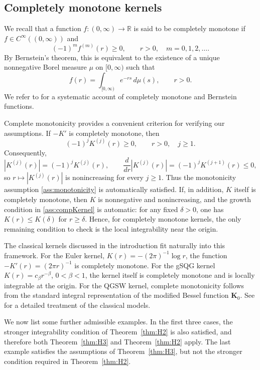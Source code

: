 \documentclass[a4paper]{amsart}
\theoremstyle{definition}
\begin{document}
\subsection{Completely monotone kernels}

We recall that a function \(f:(0,\infty)\to\mathbb{R}\) is said to be completely monotone if
\(f\in C^\infty((0,\infty))\) and
\[
    (-1)^m f^{(m)}(r)\ge 0,
    \qquad r>0,\quad m=0,1,2,\ldots.
\]
By Bernstein's theorem, this is equivalent to the existence of a unique nonnegative Borel measure
\(\mu\) on \([0,\infty)\) such that
\[
    f(r)=\int_{[0,\infty)} e^{-rs}\,d\mu(s),
    \qquad r>0.
\]
We refer to \cite[Chapter 1]{schilling2010bernstein} for a systematic account of completely monotone and
Bernstein functions.

Complete monotonicity provides a convenient criterion for verifying our assumptions. If
\(-K'\) is completely monotone, then
\[
    (-1)^j K^{(j)}(r)\ge 0,
    \qquad r>0,\quad j\ge 1.
\]
Consequently,
\[
    |K^{(j)}(r)|=(-1)^jK^{(j)}(r),
    \qquad
    \frac{d}{dr}|K^{(j)}(r)|
    =
    (-1)^jK^{(j+1)}(r)\le0,
\]
so \(r\mapsto |K^{(j)}(r)|\) is nonincreasing for every \(j\ge1\). Thus the monotonicity assumption
\ref{ass:monotonicity} is automatically satisfied. If, in addition, \(K\) itself is completely monotone, then \(K\) is nonnegative and nonincreasing, and the growth condition in \ref{ass:compKernel} is automatic: for any fixed \(\delta>0\), one has \(K(r)\le K(\delta)\) for \(r\ge\delta\). Hence, for completely monotone kernels, the only remaining condition to check is the local integrability near the origin.

The classical kernels discussed in the introduction fit naturally into this framework. For the Euler kernel,
\(K(r)=-(2\pi)^{-1}\log r\), the function \(-K'(r)=(2\pi r)^{-1}\) is completely monotone. For the gSQG kernel \(K(r)=c_\beta r^{-\beta}\), \(0<\beta<1\), the kernel itself is completely monotone and is locally integrable at the origin. For the QGSW kernel, complete monotonicity follows from the standard integral representation of the modified Bessel function \(\mathbf{K}_0\). See \cite{hmidi2023unifiedtheoryvstatesstructures} for a detailed treatment of the classical models.

We now list some further admissible examples. In the first three cases, the stronger integrability condition of Theorem~\ref{thm:H2} is also satisfied, and therefore both Theorem~\ref{thm:H3} and Theorem~\ref{thm:H2} apply. The last example satisfies the assumptions of Theorem~\ref{thm:H3}, but not the stronger condition required in Theorem~\ref{thm:H2}.
\end{document}
